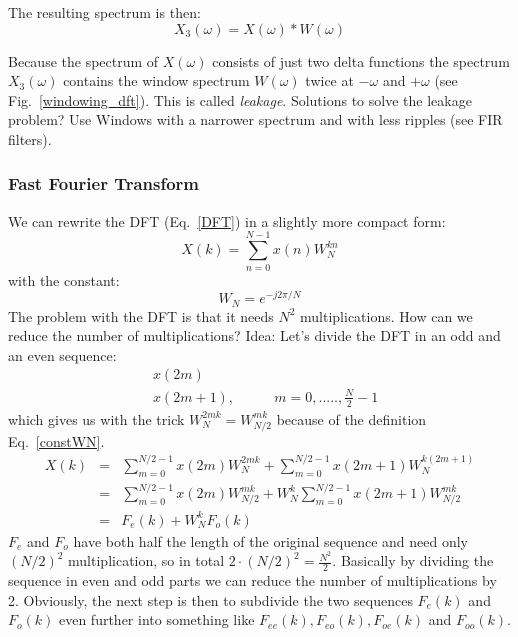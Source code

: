\documentclass[12pt,a4paper]{article}
\begin{document}
The resulting spectrum is then:
\begin{equation} 
X_{3}(\omega) = X(\omega) * W(\omega)
\end{equation}

Because the spectrum of $X(\omega)$ consists of just two delta functions
the spectrum $X_{3}(\omega)$ contains the window spectrum $W(\omega)$ twice at
$-\omega$ and $+\omega$ (see Fig.~\ref{windowing_dft}). This
is called \textsl{leakage}. Solutions to solve the leakage problem?
Use Windows with a narrower spectrum and with less ripples
(see FIR filters).








\subsubsection{Fast Fourier Transform}

We can rewrite the DFT (Eq.~\ref{DFT}) in a slightly more compact form:
\begin{equation} 
X(k) = \sum_{n = 0}^{N-1}  x(n) W_{N}^{kn}
\label{compactDFT}
\end{equation}
with the constant:
\begin{equation} 
W_{N} = e^{-j 2\pi/N}
\label{constWN}
\end{equation}
The problem with the DFT is that it needs $N^2$ multiplications.
How can we reduce the number of multiplications?
Idea: Let's divide the DFT in an odd and an even sequence:
\begin{eqnarray}
& x(2m) & \\
& x(2m + 1), & \qquad m = 0, ..... , \frac{N}{2} - 1
\end{eqnarray}
which gives us with the trick $W_N^{2mk} = W_{N/2}^{mk}$ because of the
definition Eq.~\ref{constWN}.
\begin{eqnarray} 
X(k) & = & \sum_{m=0}^{N/2-1} x(2m) W_{N}^{2mk} + \sum_{m=0}^{N/2 - 1}  x(2m + 1) W_{N}^{k (2m + 1)} \\
& = & \sum_{m=0}^{N/2-1} x(2m) W_{N/2}^{mk} + W_{N}^{k} \sum_{m = 0}^{N/2 - 1} x(2m + 1) W_{N/2}^{mk} \\
& = & F_{e}(k) + W_{N}^{k} F_{o}(k)
\end{eqnarray}
$F_e$ and $F_o$ have both half the length of the original sequence and
need only $(N/2)^2$ multiplication, so in total $2 \cdot (N/2)^2 = \frac{N^2}{2}$.
Basically by dividing the sequence in even and odd parts we can reduce
the number of multiplications by 2. Obviously, the next step is then
to subdivide the two sequences $F_{e}(k)$ and $F_{o}(k)$ even further
into something like $F_{ee}(k), F_{eo}(k), F_{oe}(k)$ and $F_{oo}(k)$.
\end{document}
